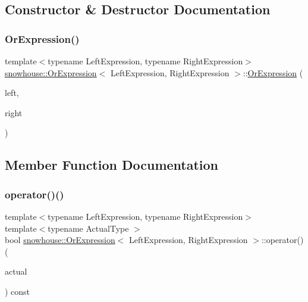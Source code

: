 \subsection{Constructor \& Destructor Documentation}
\mbox{\label{structsnowhouse_1_1OrExpression_a25bc03ea7c203e83d638eec5dc4f128e}} 
\subsubsection{\texorpdfstring{OrExpression()}{OrExpression()}}
{\footnotesize\ttfamily template$<$typename Left\+Expression, typename Right\+Expression$>$ \\
\mbox{\hyperlink{structsnowhouse_1_1OrExpression}{snowhouse\+::\+Or\+Expression}}$<$ Left\+Expression, Right\+Expression $>$\+::\mbox{\hyperlink{structsnowhouse_1_1OrExpression}{Or\+Expression}} (\begin{DoxyParamCaption}\item[{const Left\+Expression \&}]{left,  }\item[{const Right\+Expression \&}]{right }\end{DoxyParamCaption})\hspace{0.3cm}{\ttfamily [inline]}}



\subsection{Member Function Documentation}
\mbox{\label{structsnowhouse_1_1OrExpression_a78df18f570ec5cf2fda3b192056d4bad}} 
\subsubsection{\texorpdfstring{operator()()}{operator()()}}
{\footnotesize\ttfamily template$<$typename Left\+Expression, typename Right\+Expression$>$ \\
template$<$typename Actual\+Type $>$ \\
bool \mbox{\hyperlink{structsnowhouse_1_1OrExpression}{snowhouse\+::\+Or\+Expression}}$<$ Left\+Expression, Right\+Expression $>$\+::operator() (\begin{DoxyParamCaption}\item[{const Actual\+Type \&}]{actual }\end{DoxyParamCaption}) const\hspace{0.3cm}{\ttfamily [inline]}}



